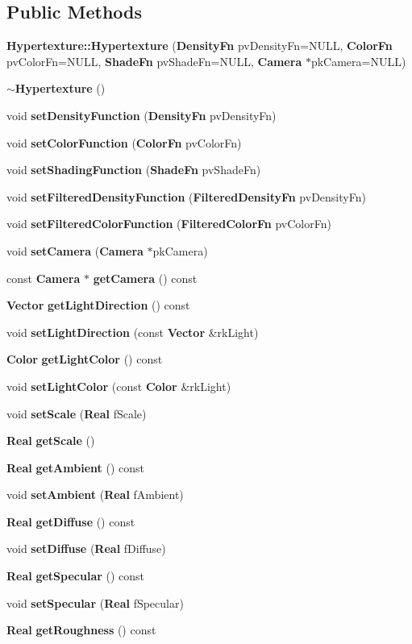 \subsection*{Public Methods}
\begin{CompactItemize}
\item 
{\bf Hypertexture::Hypertexture} ({\bf Density\-Fn} pv\-Density\-Fn=NULL, {\bf Color\-Fn} pv\-Color\-Fn=NULL, {\bf Shade\-Fn} pv\-Shade\-Fn=NULL, {\bf Camera} $\ast$pk\-Camera=NULL)
\item 
{\bf $\sim$Hypertexture} ()
\item 
void {\bf set\-Density\-Function} ({\bf Density\-Fn} pv\-Density\-Fn)
\item 
void {\bf set\-Color\-Function} ({\bf Color\-Fn} pv\-Color\-Fn)
\item 
void {\bf set\-Shading\-Function} ({\bf Shade\-Fn} pv\-Shade\-Fn)
\item 
void {\bf set\-Filtered\-Density\-Function} ({\bf Filtered\-Density\-Fn} pv\-Density\-Fn)
\item 
void {\bf set\-Filtered\-Color\-Function} ({\bf Filtered\-Color\-Fn} pv\-Color\-Fn)
\item 
void {\bf set\-Camera} ({\bf Camera} $\ast$pk\-Camera)
\item 
const {\bf Camera} $\ast$ {\bf get\-Camera} () const
\item 
{\bf Vector} {\bf get\-Light\-Direction} () const
\item 
void {\bf set\-Light\-Direction} (const {\bf Vector} \&rk\-Light)
\item 
{\bf Color} {\bf get\-Light\-Color} () const
\item 
void {\bf set\-Light\-Color} (const {\bf Color} \&rk\-Light)
\item 
void {\bf set\-Scale} ({\bf Real} f\-Scale)
\item 
{\bf Real} {\bf get\-Scale} ()
\item 
{\bf Real} {\bf get\-Ambient} () const
\item 
void {\bf set\-Ambient} ({\bf Real} f\-Ambient)
\item 
{\bf Real} {\bf get\-Diffuse} () const
\item 
void {\bf set\-Diffuse} ({\bf Real} f\-Diffuse)
\item 
{\bf Real} {\bf get\-Specular} () const
\item 
void {\bf set\-Specular} ({\bf Real} f\-Specular)
\item 
{\bf Real} {\bf get\-Roughness} () const
\item 

\end{CompactItemize}

